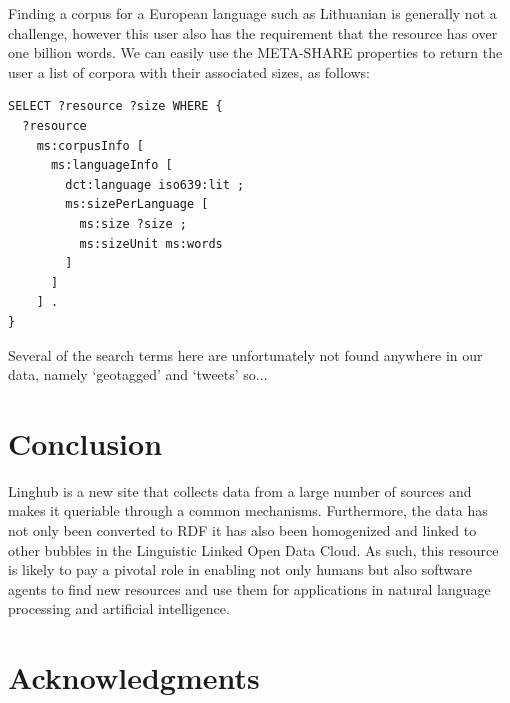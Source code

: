 \documentclass{acm_proc_article-sp}
\begin{document}

Finding a corpus for a European language such as Lithuanian is generally not a
challenge, however this user also has the requirement that the resource has over
one billion words. We can easily use the META-SHARE properties to return the
user a list of corpora with their associated sizes, as follows:

\begin{verbatim}
SELECT ?resource ?size WHERE {
  ?resource
    ms:corpusInfo [
      ms:languageInfo [
        dct:language iso639:lit ;
        ms:sizePerLanguage [
          ms:size ?size ;
          ms:sizeUnit ms:words
        ]
      ]
    ] .
}
\end{verbatim}
      

Several of the search terms here are unfortunately not found anywhere in our
data, namely `geotagged' and `tweets' so...



\section{Conclusion}

Linghub is a new site that collects data from a large number of sources and
makes it queriable through a common mechanisms. Furthermore, the data has not
only been converted to RDF it has also been homogenized and linked to other
bubbles in the Linguistic Linked Open Data Cloud. As such, this resource is
likely to pay a pivotal role in enabling not only humans but also software
agents to find new resources and use them for applications in natural language
processing and artificial intelligence.

\section*{Acknowledgments}
\end{document}
